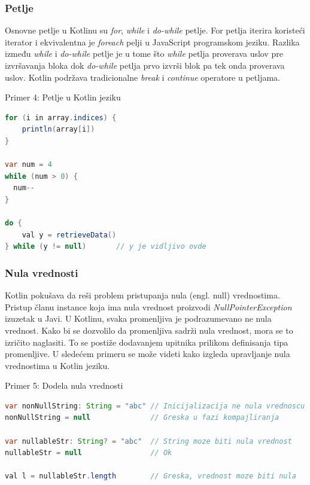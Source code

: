 \documentclass[12pt,oneside]{memoir}
\begin{document}
 
\subsubsection{Petlje}
Osnovne petlje u Kotlinu su \emph{for}, \emph{while} i \emph{do-while} petlje. For petlja iterira koristeći iterator i ekvivalentna je \emph{foreach} pelji u JavaScript programskom jeziku. Razlika između \emph{while} i \emph{do-while} petlje je u tome što \emph{while} petlja proverava uslov pre izvršavanja bloka dok \emph{do-while} petlja prvo izvrši blok pa tek onda proverava uslov. Kotlin podržava tradicionalne \emph{break} i \emph{continue} operatore u petljama.

\begin{center} Primer 4: Petlje u Kotlin jeziku\end{center}
\begin{lstlisting}[language=Java]
for (i in array.indices) {
    println(array[i])
}
 
var num = 4 
while (num > 0) {
  num--
}
 
do {
    val y = retrieveData()
} while (y != null)       // y je vidljivo ovde 
\end{lstlisting}
 
\subsubsection{Nula vrednosti}
Kotlin pokušava da reši problem pristupanja nula (engl. null) vrednostima. Pristup članu instance koja ima nula vrednost proizvodi \emph{NullPointerException} izuzetak u Javi. U Kotlinu, svaka promenljiva je podrazumevano ne nula vrednost. Kako bi se dozvolilo da promenljiva sadrži nula vrednost, mora se to izričito naglasiti. To se postiže dodavanjem upitnika prilikom definisanja tipa promenljive. U sledećem primeru se može videti kako izgleda upravljanje nula vrednostima u Kotlin jeziku.

\begin{center} Primer 5: Dodela nula vrednosti\end{center}
\begin{lstlisting}[language=Java]
var nonNullString: String = "abc" // Inicijalizacija ne nula vrednoscu
nonNullString = null              // Greska u fazi kompajliranja
 
var nullableStr: String? = "abc"  // String moze biti nula vrednost
nullableStr = null                // Ok
 
val l = nullableStr.length        // Greska, vrednost moze biti nula
\end{lstlisting}
 
\end{document}
